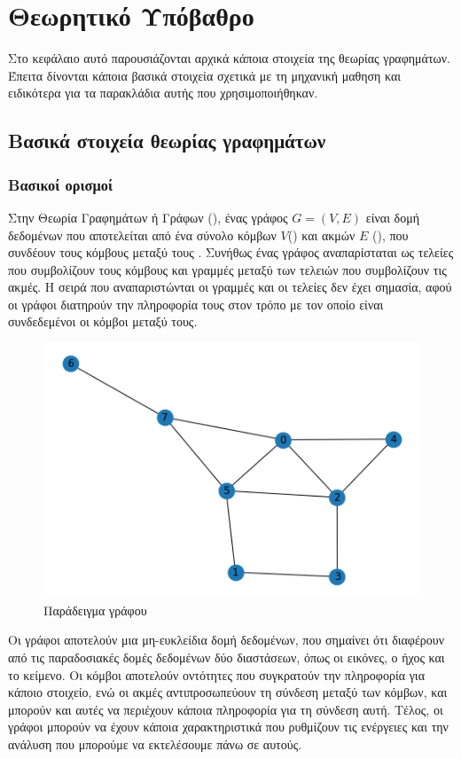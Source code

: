 \chapter{Θεωρητικό Υπόβαθρο}

Στο κεφάλαιο αυτό παρουσιάζονται αρχικά κάποια στοιχεία της θεωρίας γραφημάτων. Έπειτα δίνονται 
κάποια βασικά στοιχεία σχετικά με τη μηχανική μαθηση και ειδικότερα για τα παρακλάδια αυτής
που χρησιμοποιήθηκαν.

\section{Βασικά στοιχεία θεωρίας γραφημάτων}
\subsection{Βασικοί ορισμοί}

Στην Θεωρία  Γραφημάτων ή Γράφων (), ένας γράφος \(G = (V,E)\)  είναι δομή δεδομένων που
αποτελείται από ένα σύνολο κόμβων \(V\)() και ακμών \(E\) (), που 
συνδέουν τους κόμβους μεταξύ τους \cite{Diestel} \cite{barabasi}. Συνήθως ένας γράφος
αναπαρίσταται ως τελείες που συμβολίζουν τους κόμβους και γραμμές μεταξύ των τελειών που
συμβολίζουν τις ακμές. Η σειρά που αναπαριστώνται οι γραμμές και οι τελείες δεν έχει σημασία,
αφού οι γράφοι διατηρούν την πληροφορία τους στον τρόπο με τον οποίο είναι συνδεδεμένοι οι 
κόμβοι μεταξύ τους.

\begin{figure}[!ht] \centering
\includegraphics[scale = 0.5]{static/figures/graph_example.png} 
\caption{Παράδειγμα γράφου}
\label{figure1.1}
\end{figure}

Οι γράφοι αποτελούν μια μη-ευκλείδια δομή δεδομένων, που σημαίνει ότι διαφέρουν από
τις παραδοσιακές δομές δεδομένων δύο διαστάσεων, όπως οι εικόνες, ο ήχος και το κείμενο. Οι
κόμβοι αποτελούν οντότητες που συγκρατούν την πληροφορία για κάποιο στοιχείο, ενώ οι ακμές
αντιπροσωπεύουν τη σύνδεση μεταξύ των κόμβων, και μπορούν και αυτές να περιέχουν κάποια
πληροφορία για τη σύνδεση αυτή. Τέλος, οι γράφοι μπορούν να έχουν κάποια χαρακτηριστικά που
ρυθμίζουν τις ενέργειες και την ανάλυση που μπορούμε να εκτελέσουμε πάνω σε αυτούς.

